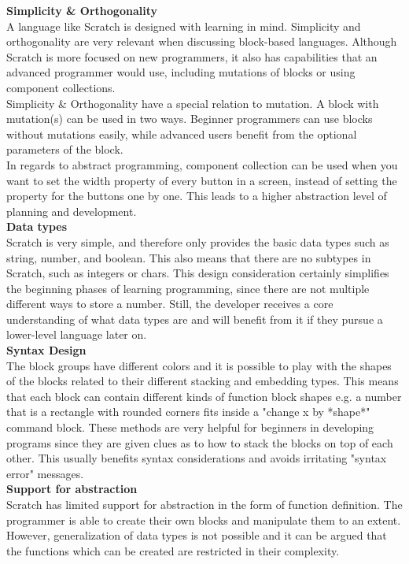 \noindent\textbf{Simplicity \& Orthogonality}\\
\noindent A language like Scratch is designed with learning in mind. Simplicity and orthogonality are very relevant when discussing block-based languages. Although Scratch is more focused on new programmers, it also has capabilities that an advanced programmer would use, including mutations of blocks or using component collections.\\

Simplicity \& Orthogonality have a special relation to mutation. A block with mutation(s) can be used in two ways. Beginner programmers can use blocks without mutations easily, while advanced users benefit from the optional parameters of the block.\\

In regards to abstract programming, component collection can be used when you want to set the width property of every button in a screen, instead of setting the property for the buttons one by one. This leads to a higher abstraction level of planning and development.\\

\noindent\textbf{Data types}\\
\noindent Scratch is very simple, and therefore only provides the basic data types such as string, number, and boolean. This also means that there are no subtypes in Scratch, such as integers or chars. This design consideration certainly simplifies the beginning phases of learning programming, since there are not multiple different ways to store a number. Still, the developer receives a core understanding of what data types are and will benefit from it if they pursue a lower-level language later on.\\

\noindent\textbf{Syntax Design}\\
\noindent The block groups have different colors and it is possible to play with the shapes of the blocks related to their different stacking and embedding types. This means that each block can contain different kinds of function block shapes e.g. a number that is a rectangle with rounded corners fits inside a "change x by *shape*" command block. These methods are very helpful for beginners in developing programs since they are given clues as to how to stack the blocks on top of each other. This usually benefits syntax considerations and avoids irritating "syntax error" messages.\\

\noindent\textbf{Support for abstraction}\\
Scratch has limited support for abstraction in the form of function definition. The programmer is able to create their own blocks and manipulate them to an extent. However, generalization of data types is not possible and it can be argued that the functions which can be created are restricted in their complexity. \\


